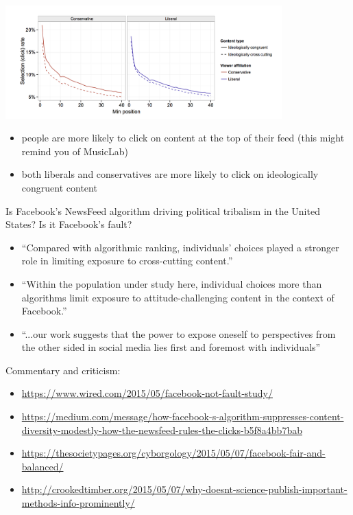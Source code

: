 \documentclass[aspectratio=169]{beamer}
\begin{document}
\begin{frame}

\begin{center}
\includegraphics[width=0.8\textwidth]{figures/bakshy_exposure_2015_s5a}
\end{center}

\begin{itemize}
\item people are more likely to click on content at the top of their feed (this might remind you of MusicLab) \pause
\item both liberals and conservatives are more likely to click on ideologically congruent content 
\end{itemize}

\end{frame}
\begin{frame}

Is Facebook's NewsFeed algorithm driving political tribalism in the United States? Is it Facebook's fault?
\begin{itemize}
\item ``Compared with algorithmic ranking, individuals' choices played a stronger role in limiting exposure to cross-cutting content.'' \pause
\item ``Within the population under study here, individual choices more than algorithms limit exposure to attitude-challenging content in the context of Facebook.'' \pause
\item ``...our work suggests that the power to expose oneself to perspectives from the other sided in social media lies first and foremost with individuals''
\end{itemize}

\end{frame}
\begin{frame}

Commentary and criticism:
\begin{itemize}
\item \url{https://www.wired.com/2015/05/facebook-not-fault-study/}
\item \url{https://medium.com/message/how-facebook-s-algorithm-suppresses-content-diversity-modestly-how-the-newsfeed-rules-the-clicks-b5f8a4bb7bab}
\item \url{https://thesocietypages.org/cyborgology/2015/05/07/facebook-fair-and-balanced/}
\item \url{http://crookedtimber.org/2015/05/07/why-doesnt-science-publish-important-methods-info-prominently/}
\end{itemize}

\end{frame}
\end{document}
